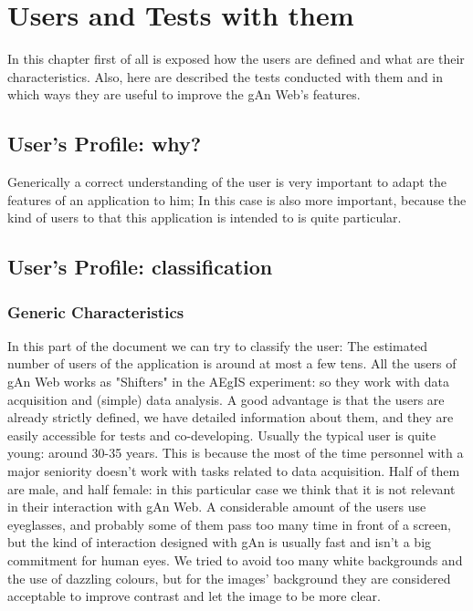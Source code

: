 
\chapter{Users and Tests with them} %

\label{Chapter6} %

In this chapter first of all is exposed how the users are defined and what are their characteristics. Also, here are described the tests conducted with them and in which ways they are useful to improve the gAn Web's features.   

\section{User's Profile: why?}

Generically a correct understanding of the user is very important to adapt the features of an application to him; In this case is also more important, because the kind of users to that this application is intended to is quite particular.


\section{User's Profile: classification}

\subsection{Generic Characteristics}
In this part of the document we can try to classify the user:
The estimated number of users of the application is around at most a few tens.
All the users of gAn Web works as "Shifters" in the AEgIS experiment: so they work with data acquisition and (simple) data analysis.
A good advantage is that the users are already strictly defined, we have detailed information about them, and they are easily accessible for tests and co-developing.
Usually the typical user is quite young: around 30-35 years. This is because the most of the time personnel with a major seniority doesn't work with tasks related to data acquisition. 
Half of them are male, and half female: in this particular case we think that it is not relevant in their interaction with gAn Web.
A considerable amount of the users use eyeglasses, and probably some of them pass too many time in front of a screen, but the kind of interaction designed with gAn is usually fast and isn't a big commitment for human eyes. We tried to avoid too many white backgrounds and the use of dazzling colours, but for the images' background they are considered acceptable to improve contrast and let the image to be more clear.  

